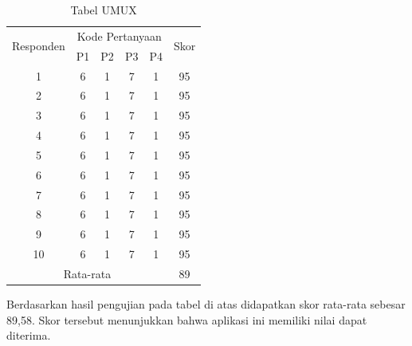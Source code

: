 \begin{enumerate}
	\begin{table}[H]
		\begin{center}
		\caption{Tabel UMUX}
		\label{tab:jadwal}
		\begin{tabular}{|c|c|c|c|c|c|}
		\hline
		\multirow{2}{*}{Responden}&\multicolumn{4}{c|}{Kode Pertanyaan}&\multirow{2}{*}{Skor}\\
		\cline{2-5}
		&P1&P2&P3&P4&\\
		\hline
		1&6&1&7&1&95\\
		\hline
		2&6&1&7&1&95\\
		\hline
		3&6&1&7&1&95\\
		\hline
		4&6&1&7&1&95\\
		\hline
		5&6&1&7&1&95\\
		\hline
		6&6&1&7&1&95\\
		\hline
		7&6&1&7&1&95\\
		\hline
		8&6&1&7&1&95\\
		\hline
		9&6&1&7&1&95\\
		\hline
		10&6&1&7&1&95\\
		\hline
		\multicolumn{5}{|c|}{Rata-rata}&89\\
		\hline
		\end{tabular}
		\end{center}
	\end{table}

	\par Berdasarkan hasil pengujian pada tabel di atas didapatkan skor rata-rata sebesar 89,58. Skor tersebut menunjukkan bahwa aplikasi ini memiliki nilai dapat diterima.
\end{enumerate}

